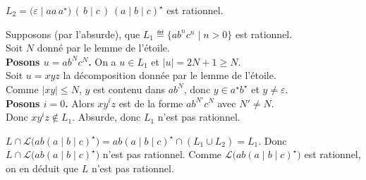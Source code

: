 \begin{corrections}

  \begin{questions}

  \item $L_2 = \big(\varepsilon \mid aa\,a^\star\big)\,(\,b\mid c\,)\,(a\mid b\mid c)^\star$ est rationnel.

  \item Supposons (par l'absurde), que $L_1 \eqdef \{ab^n c^n \mid n>0\}$ est rationnel.\\
    Soit $N$ donné par le lemme de l'étoile.\\
    \textbf{Posons $u = a b^N c^N$.} On a $u\in L_1$ et $|u|=2N+1\ge N$.\\
    Soit $u=xyz$ la décomposition donnée par le lemme de l'étoile.\\
    Comme $|xy|\le N$, $y$ est contenu dans $ab^N$, donc $y\in a^\star b^\star$ et $y\neq\varepsilon$.\\
    \textbf{Posons $i=0$.} Alors $xy^iz$ est de la forme $a b^{N'} c^N$ avec $N'\neq N$.\\
    Donc $xy^iz \notin L_1$. Absurde, donc $L_1$ n'est pas rationnel.

  \item $L\cap \mathcal{L}\big(ab(a\mid b\mid c)^\star\big) = ab(a\mid b\mid c)^\star \cap (L_1\cup L_2)= L_1$.
    Donc $L\cap \mathcal{L}\big(ab(a\mid b\mid c)^\star\big)$ n'est pas rationnel.
    Comme $\mathcal{L}\big(ab(a\mid b\mid c)^\star\big)$ est rationnel, on en déduit que $L$ n'est pas rationnel.


\end{questions}
\end{corrections}
